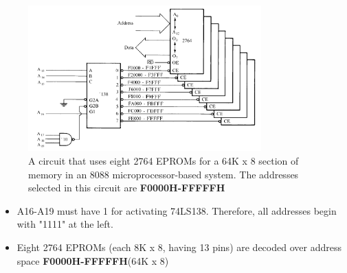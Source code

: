 \begin{figure}[h!]
  \includegraphics[width = 0.8\textwidth]{./figures/Decoder_Bank.png}
  \caption{A circuit that uses eight 2764 EPROMs for a 64K x 8 section of memory in an
  8088 microprocessor-based system. The addresses selected in this circuit are \textbf{F0000H-FFFFFH}}
  \label{}
\end{figure}
\begin{itemize}
  \item A16-A19 must have 1 for activating 74LS138. Therefore, all addresses begin with "1111" at the left.
  \item Eight 2764 EPROMs (each 8K x 8, having 13 pins) are decoded over address space \textbf{F0000H-FFFFFH}(64K x 8)
\end{itemize}

